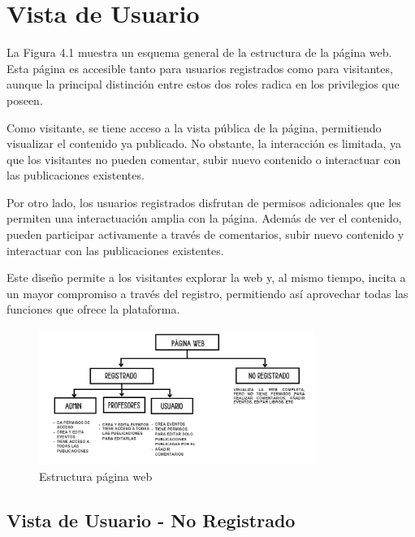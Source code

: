 \documentclass[a4paper, 12pt]{book}
\begin{document}
\section{Vista de Usuario}
\label{sec:vista_usuarios}
La Figura 4.1 muestra un esquema general de la estructura de la página web. Esta página es accesible tanto para usuarios registrados 
como para visitantes, aunque la principal distinción entre estos dos roles radica en los privilegios que poseen.

Como visitante, se tiene acceso a la vista pública de la página, permitiendo visualizar el contenido ya publicado. No obstante, la interacción 
es limitada, ya que los visitantes no pueden comentar, subir nuevo contenido o interactuar con las publicaciones existentes.

Por otro lado, los usuarios registrados disfrutan de permisos adicionales que les permiten una interactuación amplia con la página. Además de ver el 
contenido, pueden participar activamente a través de comentarios, subir nuevo contenido y interactuar con las publicaciones existentes.

Este diseño permite a los visitantes explorar la web y, al mismo tiempo, incita a un mayor compromiso a través del registro, permitiendo así aprovechar 
todas las funciones que ofrece la plataforma.
\begin{figure}
  \centering
  \includegraphics[width=9cm, keepaspectratio]{img/esquema.png}
  \caption{Estructura página web}
  \label{fig:arquitectura}
\end{figure}

\subsection{Vista de Usuario - No Registrado}
\label{sec:vista_usuarios_no_registrado}
\end{document}
